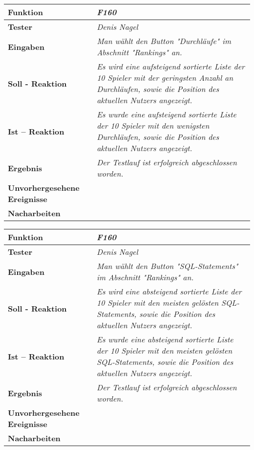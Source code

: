 \newpage
\begin{longtable}{|p{4cm}|p{11cm}|}
\hline
\textbf{Funktion} & \textit{\textbf{F160}} \\
\hline
\textbf{Tester} & \textit{Denis Nagel} \\
\hline
\textbf{Eingaben} & \textit{Man wählt den Button "Durchläufe" im Abschnitt "Rankings" an.} \\
\hline
\textbf{Soll - Reaktion} & \textit{Es wird eine aufsteigend sortierte Liste der 10 Spieler mit der geringsten Anzahl an Durchläufen, sowie die Position des aktuellen Nutzers angezeigt.} \\
\hline
\textbf{Ist -- Reaktion} & \textit{Es wurde eine aufsteigend sortierte Liste der 10 Spieler mit den wenigsten Durchläufen, sowie die Position des aktuellen Nutzers angezeigt.} \\
\hline
\textbf{Ergebnis} & \textit{Der Testlauf ist erfolgreich abgeschlossen worden.} \\
\hline
\textbf{Unvorhergesehene Ereignisse} &
\textit{} \\
\hline
\textbf{Nacharbeiten } & \textit{} \\
\hline
\end{longtable}

\newpage
\begin{longtable}{|p{4cm}|p{11cm}|}
\hline
\textbf{Funktion} & \textit{\textbf{F160}} \\
\hline
\textbf{Tester} & \textit{Denis Nagel} \\
\hline
\textbf{Eingaben} & \textit{Man wählt den Button "SQL-Statements" im Abschnitt "Rankings" an.} \\
\hline
\textbf{Soll - Reaktion} & \textit{Es wird eine absteigend sortierte Liste der 10 Spieler mit den meisten gelösten SQL-Statements, sowie die Position des aktuellen Nutzers angezeigt.} \\
\hline
\textbf{Ist -- Reaktion} & \textit{Es wurde eine absteigend sortierte Liste der 10 Spieler mit den meisten gelösten SQL-Statements, sowie die Position des aktuellen Nutzers angezeigt.} \\
\hline
\textbf{Ergebnis} & \textit{Der Testlauf ist erfolgreich abgeschlossen worden.} \\
\hline
\textbf{Unvorhergesehene Ereignisse} &
\textit{} \\
\hline
\textbf{Nacharbeiten } & \textit{} \\
\hline
\end{longtable}

